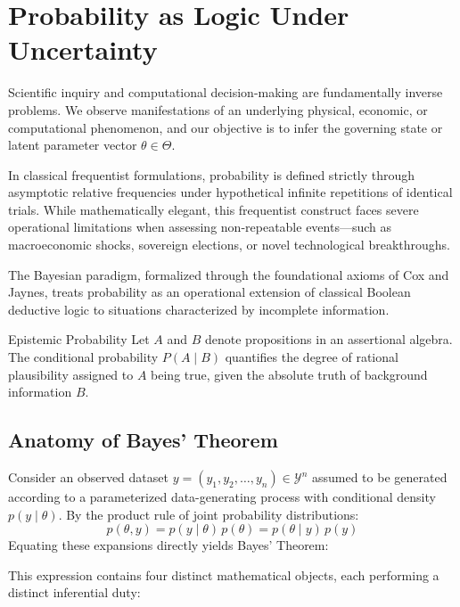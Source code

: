 \section{Probability as Logic Under Uncertainty}

Scientific inquiry and computational decision-making are fundamentally inverse problems. We observe manifestations of an underlying physical, economic, or computational phenomenon, and our objective is to infer the governing state or latent parameter vector \(\theta \in \Theta\).

In classical frequentist formulations, probability is defined strictly through asymptotic relative frequencies under hypothetical infinite repetitions of identical trials. While mathematically elegant, this frequentist construct faces severe operational limitations when assessing non-repeatable events---such as macroeconomic shocks, sovereign elections, or novel technological breakthroughs.

The Bayesian paradigm, formalized through the foundational axioms of Cox and Jaynes, treats probability as an operational extension of classical Boolean deductive logic to situations characterized by incomplete information.

\begin{DefinitionBox}{Epistemic Probability}
  Let \(A\) and \(B\) denote propositions in an assertional algebra. The conditional probability \(P(A \mid B)\) quantifies the degree of rational plausibility assigned to \(A\) being true, given the absolute truth of background information \(B\).
\end{DefinitionBox}

\subsection{Anatomy of Bayes' Theorem}

Consider an observed dataset \(y = (y_1, y_2, \dots, y_n) \in \mathcal{Y}^n\) assumed to be generated according to a parameterized data-generating process with conditional density \(p(y \mid \theta)\). By the product rule of joint probability distributions:
\[
  p(\theta, y) = p(y \mid \theta) \, p(\theta) = p(\theta \mid y) \, p(y)
\]
Equating these expansions directly yields Bayes' Theorem:


This expression contains four distinct mathematical objects, each performing a distinct inferential duty:

